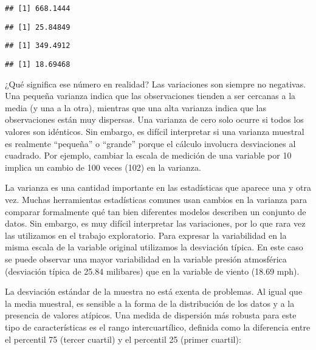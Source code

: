 \documentclass[
]{book}
\newenvironment{Shaded}{\begin{snugshade}}{\end{snugshade}}
\newcommand{\FunctionTok}[1]{\textcolor[rgb]{0.00,0.00,0.00}{#1}}
\newcommand{\NormalTok}[1]{#1}
\newcommand{\SpecialCharTok}[1]{\textcolor[rgb]{0.00,0.00,0.00}{#1}}
\begin{document}
\begin{verbatim}
## [1] 668.1444
\end{verbatim}

\begin{verbatim}
## [1] 25.84849
\end{verbatim}

\begin{Shaded}
\end{Shaded}

\begin{verbatim}
## [1] 349.4912
\end{verbatim}

\begin{verbatim}
## [1] 18.69468
\end{verbatim}

¿Qué significa ese número en realidad? Las variaciones son siempre no negativas. Una pequeña varianza indica que las observaciones tienden a ser cercanas a la media (y una a la otra), mientras que una alta varianza indica que las observaciones están muy dispersas. Una varianza de cero solo ocurre si todos los valores son idénticos. Sin embargo, es difícil interpretar si una varianza muestral es realmente ``pequeña'' o ``grande'' porque el cálculo involucra desviaciones al cuadrado. Por ejemplo, cambiar la escala de medición de una variable por 10 implica un cambio de 100 veces (102) en la varianza.

La varianza es una cantidad importante en las estadísticas que aparece una y otra vez. Muchas herramientas estadísticas comunes usan cambios en la varianza para comparar formalmente qué tan bien diferentes modelos describen un conjunto de datos. Sin embargo, es muy difícil interpretar las variaciones, por lo que rara vez las utilizamos en el trabajo exploratorio. Para expresar la variabilidad en la misma escala de la variable original utilizamos la desviación típica. En este caso se puede observar una mayor variabilidad en la variable presión atmosférica (desviación típica de 25.84 milibares) que en la variable de viento (18.69 mph).

La desviación estándar de la muestra no está exenta de problemas. Al igual que la media muestral, es sensible a la forma de la distribución de los datos y a la presencia de valores atípicos. Una medida de dispersión más robusta para este tipo de características es el rango intercuartílico, definida como la diferencia entre el percentil 75 (tercer cuartil) y el percentil 25 (primer cuartil):
\end{document}
